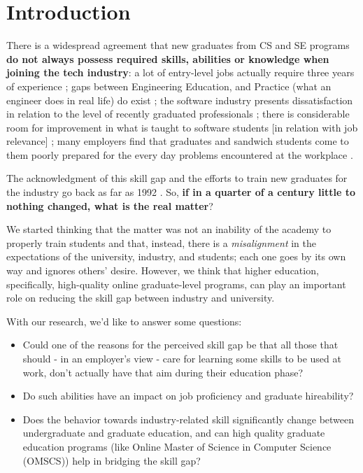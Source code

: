 \documentclass{sigchi}
\begin{document}
  
\section{Introduction}
There is a widespread agreement that new graduates from CS and SE programs \textbf{do not always possess required skills, abilities or knowledge when joining the tech industry}: a lot of entry-level jobs actually require three years of experience \cite{Chakrabarti2018}; gaps between Engineering Education, and Practice (what an engineer does in real life) do exist \cite{Sivanesan2017}; the software industry presents dissatisfaction in relation to the level of recently graduated professionals \cite{Portela2017}; there is considerable room for improvement in what is taught to software students [in relation with job relevance] \cite{Lethbridgea}; many employers find that graduates and sandwich students come to them poorly prepared for the every day problems encountered at the workplace \cite{Dawson2000}.

The acknowledgment of this skill gap and the efforts to train new graduates for the industry go back as far as 1992 \cite{Dawson1992}. So, \textbf{if in a quarter of a century little to nothing changed, what is the real matter}?

We started thinking that the matter was not an inability of the academy to properly train students and that, instead, there is a \textit{misalignment} in the expectations of the university, industry, and students; each one goes by its own way and ignores others' desire. However, we think that higher education, specifically, high-quality online graduate-level programs, can play an important role on reducing the skill gap between industry and university.

With our research, we'd like to answer some questions:
\begin{itemize}
\item Could one of the reasons for the perceived skill gap be that all those that should - in an employer's view - care for learning some skills to be used at work, don't actually have that aim during their education phase? 
\item Do such abilities have an impact on job proficiency and graduate hireability?
\item Does the behavior towards industry-related skill significantly change between undergraduate and graduate education, and can high quality graduate education programs (like Online Master of Science in Computer Science (OMSCS)) help in bridging the skill gap?
\end{itemize}
\end{document}
